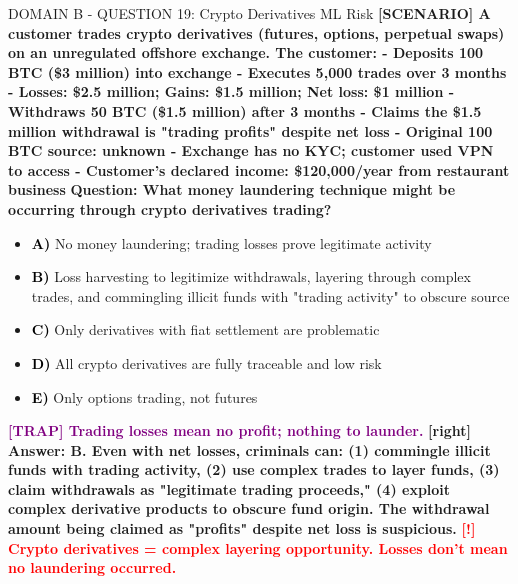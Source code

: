 \documentclass[11pt,a4paper]{beamer}
\newcommand{\redflag}[1]{\textcolor{red}{\textbf{[!] #1}}}
\newcommand{\trap}[1]{\textcolor{purple}{\textbf{[TRAP] #1}}}
\newcommand{\correct}[1]{\textcolor{green!50!black}{\textbf{[right] #1}}}
\newcommand{\scenario}[1]{\textcolor{blue!70!black}{\textbf{[SCENARIO] #1}}}
\newcommand{\option}[1]{\textcolor{black}{\textbf{#1}}}
\begin{document}
\begin{frame}{DOMAIN B - QUESTION 19: Crypto Derivatives ML Risk}
\scenario{A customer trades crypto derivatives (futures, options, perpetual swaps) on an unregulated offshore exchange. The customer:
- Deposits 100 BTC (\$3 million) into exchange
- Executes 5,000 trades over 3 months
- Losses: \$2.5 million; Gains: \$1.5 million; Net loss: \$1 million
- Withdraws 50 BTC (\$1.5 million) after 3 months
- Claims the \$1.5 million withdrawal is "trading profits" despite net loss
- Original 100 BTC source: unknown
- Exchange has no KYC; customer used VPN to access
- Customer's declared income: \$120,000/year from restaurant business}
\vspace{0.2cm}
\textbf{Question: What money laundering technique might be occurring through crypto derivatives trading?}
\vspace{0.1cm}
\begin{itemize}
    \item \option{A)} No money laundering; trading losses prove legitimate activity
    \item \option{B)} Loss harvesting to legitimize withdrawals, layering through complex trades, and commingling illicit funds with "trading activity" to obscure source
    \item \option{C)} Only derivatives with fiat settlement are problematic
    \item \option{D)} All crypto derivatives are fully traceable and low risk
    \item \option{E)} Only options trading, not futures
\end{itemize}
\vspace{0.2cm}
\trap{Trading losses mean no profit; nothing to launder.}
\correct{Answer: B. Even with net losses, criminals can: (1) commingle illicit funds with trading activity, (2) use complex trades to layer funds, (3) claim withdrawals as "legitimate trading proceeds," (4) exploit complex derivative products to obscure fund origin. The withdrawal amount being claimed as "profits" despite net loss is suspicious.}
\redflag{Crypto derivatives = complex layering opportunity. Losses don't mean no laundering occurred.}
\end{frame}
\end{document}
